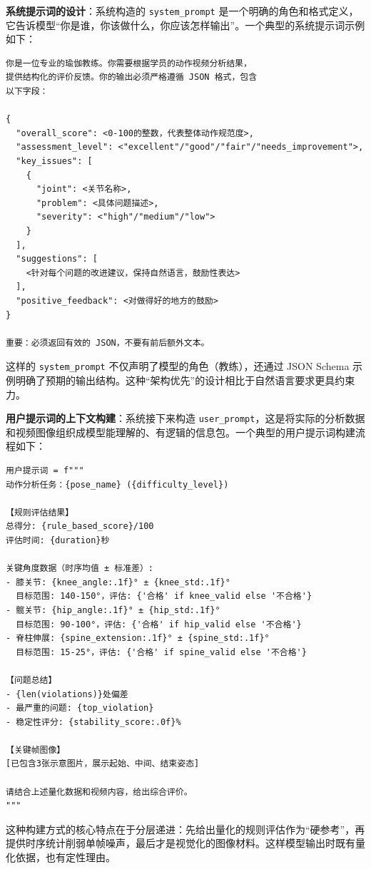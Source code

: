 \documentclass[UTF8,twoside]{ctexrep}
\makeatletter
\def@NAT@last@yr{\@citea}%
\def@NAT@last@yr{-\NAT@penalty}%
\makeatother
\begin{document}
\textbf{系统提示词的设计}：系统构造的 \texttt{system\_prompt} 是一个明确的角色和格式定义，它告诉模型“你是谁，你该做什么，你应该怎样输出”。一个典型的系统提示词示例如下：

\begin{verbatim}
你是一位专业的瑜伽教练。你需要根据学员的动作视频分析结果，
提供结构化的评价反馈。你的输出必须严格遵循 JSON 格式，包含
以下字段：

{
  "overall_score": <0-100的整数，代表整体动作规范度>,
  "assessment_level": <"excellent"/"good"/"fair"/"needs_improvement">,
  "key_issues": [
    {
      "joint": <关节名称>,
      "problem": <具体问题描述>,
      "severity": <"high"/"medium"/"low">
    }
  ],
  "suggestions": [
    <针对每个问题的改进建议，保持自然语言，鼓励性表达>
  ],
  "positive_feedback": <对做得好的地方的鼓励>
}

重要：必须返回有效的 JSON，不要有前后额外文本。
\end{verbatim}

这样的 \texttt{system\_prompt} 不仅声明了模型的角色（教练），还通过 JSON Schema 示例明确了预期的输出结构。这种“架构优先”的设计相比于自然语言要求更具约束力。

\textbf{用户提示词的上下文构建}：系统接下来构造 \texttt{user\_prompt}，这是将实际的分析数据和视频图像组织成模型能理解的、有逻辑的信息包。一个典型的用户提示词构建流程如下：

\begin{verbatim}
用户提示词 = f"""
动作分析任务：{pose_name} ({difficulty_level})

【规则评估结果】
总得分: {rule_based_score}/100
评估时间: {duration}秒

关键角度数据（时序均值 ± 标准差）:
- 膝关节: {knee_angle:.1f}° ± {knee_std:.1f}°
  目标范围: 140-150°，评估: {'合格' if knee_valid else '不合格'}
- 髋关节: {hip_angle:.1f}° ± {hip_std:.1f}°
  目标范围: 90-100°，评估: {'合格' if hip_valid else '不合格'}
- 脊柱伸展: {spine_extension:.1f}° ± {spine_std:.1f}°
  目标范围: 15-25°，评估: {'合格' if spine_valid else '不合格'}

【问题总结】
- {len(violations)}处偏差
- 最严重的问题: {top_violation}
- 稳定性评分: {stability_score:.0f}%

【关键帧图像】
[已包含3张示意图片，展示起始、中间、结束姿态]

请结合上述量化数据和视频内容，给出综合评价。
"""
\end{verbatim}

这种构建方式的核心特点在于分层递进：先给出量化的规则评估作为“硬参考”，再提供时序统计削弱单帧噪声，最后才是视觉化的图像材料。这样模型输出时既有量化依据，也有定性理由。
\end{document}
